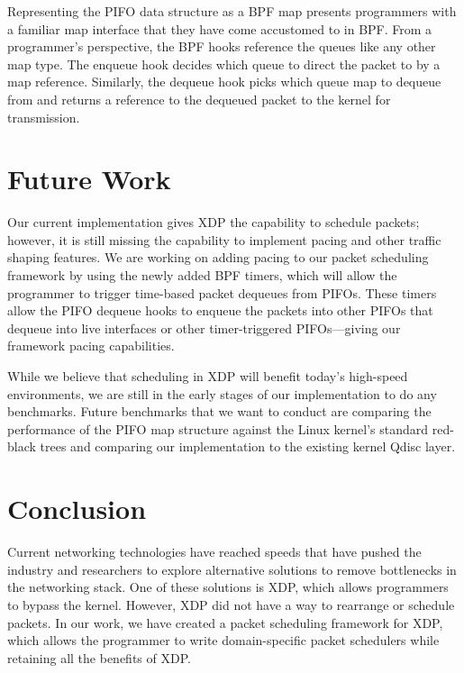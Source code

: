 \documentclass[sigconf, nonacm]{acmart}
\begin{document}
Representing the PIFO data structure as a BPF map presents programmers with a familiar map interface that they have come accustomed to in BPF. From a programmer's perspective, the BPF hooks reference the queues like any other map type. The enqueue hook decides which queue to direct the packet to by a map reference. Similarly, the dequeue hook picks which queue map to dequeue from and returns a reference to the dequeued packet to the kernel for transmission.


\section{Future Work}

Our current implementation gives XDP the capability to schedule packets; however, it is still missing the capability to implement pacing and other traffic shaping features. We are working on adding pacing to our packet scheduling framework by using the newly added BPF timers, which will allow the programmer to trigger time-based packet dequeues from PIFOs. These timers allow the PIFO dequeue hooks to enqueue the packets into other PIFOs that dequeue into live interfaces or other timer-triggered PIFOs—giving our framework pacing capabilities.

While we believe that scheduling in XDP will benefit today's high-speed environments, we are still in the early stages of our implementation to do any benchmarks. Future benchmarks that we want to conduct are comparing the performance of the PIFO map structure against the Linux kernel's standard red-black trees and comparing our implementation to the existing kernel Qdisc layer.


\section{Conclusion}

Current networking technologies have reached speeds that have pushed the industry and researchers to explore alternative solutions to remove bottlenecks in the networking stack. One of these solutions is XDP, which allows programmers to bypass the kernel. However, XDP did not have a way to rearrange or schedule packets. In our work, we have created a packet scheduling framework for XDP, which allows the programmer to write domain-specific packet schedulers while retaining all the benefits of XDP.




\end{document}
